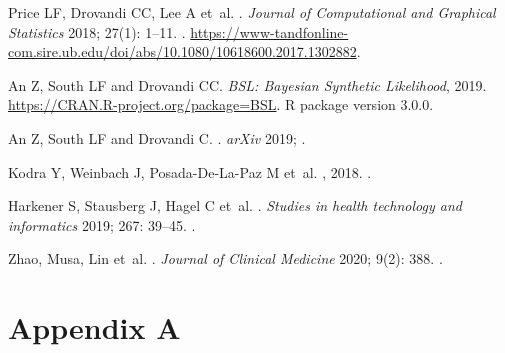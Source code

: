 \documentclass{article}
\begin{document}
\begin{thebibliography}{10}
  Price LF, Drovandi CC, Lee A et~al.
  .
  \newblock \emph{Journal of Computational and Graphical Statistics} 2018; 27(1):
    1--11.
  \newblock {}.
  \newblock
    \urlprefix\url{https://www-tandfonline-com.sire.ub.edu/doi/abs/10.1080/10618600.2017.1302882}.
  
  An Z, South LF and Drovandi CC.
  \newblock \emph{BSL: Bayesian Synthetic Likelihood}, 2019.
  \newblock \urlprefix\url{https://CRAN.R-project.org/package=BSL}.
  \newblock R package version 3.0.0.
  
  An Z, South LF and Drovandi C.
  .
  \newblock \emph{arXiv} 2019; .
  
  Kodra Y, Weinbach J, Posada-De-La-Paz M et~al.
  , 2018.
  \newblock {}.
  
  Harkener S, Stausberg J, Hagel C et~al.
  .
  \newblock \emph{Studies in health technology and informatics} 2019; 267:
    39--45.
  \newblock {}.
  
  Zhao, Musa, Lin et~al.
  .
  \newblock \emph{Journal of Clinical Medicine} 2020; 9(2): 388.
  \newblock {}.
  
  \end{thebibliography}

  \section*{Appendix A}
\end{document}
